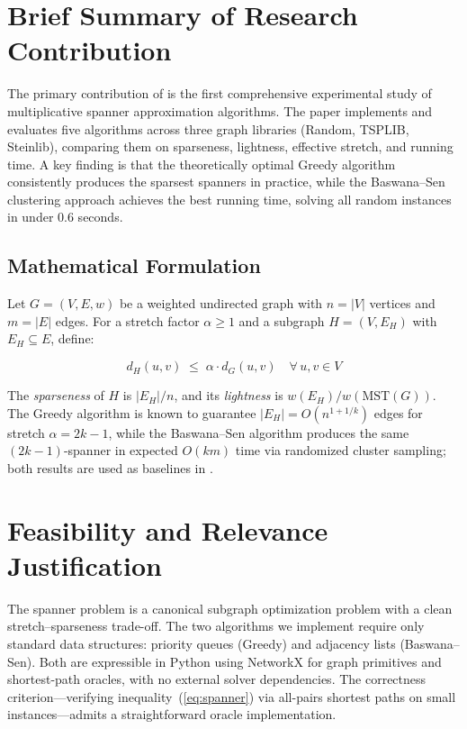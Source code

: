 \documentclass[11pt,a4paper,twocolumn]{article}
\begin{document}
\section{Brief Summary of Research Contribution}

The primary contribution of \citet{chimani2022spanner} is the
first comprehensive experimental study of multiplicative spanner
approximation algorithms.
The paper implements and evaluates five algorithms across three
graph libraries (Random, TSPLIB, Steinlib), comparing them on
sparseness, lightness, effective stretch, and running time.
A key finding is that the theoretically optimal Greedy algorithm
consistently produces the sparsest spanners in practice, while
the Baswana--Sen clustering approach achieves the best running
time, solving all random instances in under 0.6 seconds.

\subsection{Mathematical Formulation}

Let $G = (V, E, w)$ be a weighted undirected graph with $n = |V|$
vertices and $m = |E|$ edges.
For a stretch factor $\alpha \geq 1$ and a subgraph
$H = (V, E_H)$ with $E_H \subseteq E$, define:

\begin{equation}
  d_H(u,v) \;\leq\; \alpha \cdot d_G(u,v)
  \quad \forall\, u, v \in V \label{eq:spanner}
\end{equation}

The \emph{sparseness} of $H$ is $|E_H|/n$, and its
\emph{lightness} is $w(E_H)/w(\mathrm{MST}(G))$.
The Greedy algorithm is known to guarantee $|E_H| = O(n^{1+1/k})$
edges for stretch $\alpha = 2k-1$, while the Baswana--Sen
algorithm produces the same $(2k-1)$-spanner in expected $O(km)$
time via randomized cluster sampling; both results are used as
baselines in \citet{chimani2022spanner}.

\section{Feasibility and Relevance Justification}

The spanner problem is a canonical subgraph optimization problem
with a clean stretch--sparseness trade-off.
The two algorithms we implement require only standard data
structures: priority queues (Greedy) and adjacency lists
(Baswana--Sen).
Both are expressible in Python using NetworkX for graph primitives
and shortest-path oracles, with no external solver dependencies.
The correctness criterion---verifying
inequality~(\ref{eq:spanner}) via all-pairs shortest paths on
small instances---admits a straightforward oracle implementation.
\end{document}
